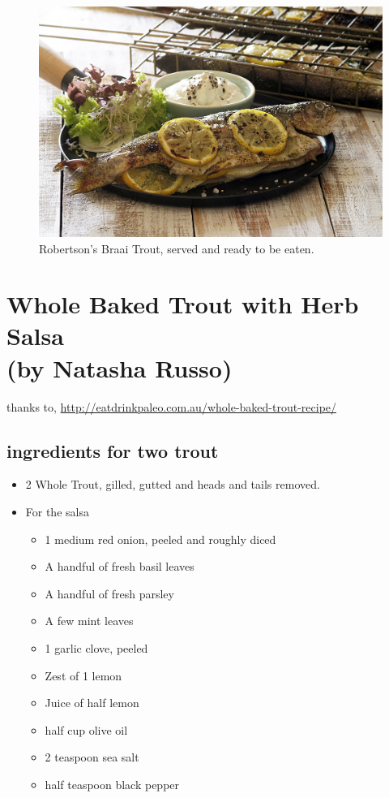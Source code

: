 \begin{figure}[H]
\centering
  \includegraphics[scale=0.2]{recipes/braaiTroutServed.jpg}
   \caption{Robertson's Braai Trout, served and ready to be eaten.}
  \label{fig:braaiTroutServed}
\end{figure}


\section{Whole Baked Trout with Herb Salsa \\ (by Natasha Russo)} 

thanks to,  \url{http://eatdrinkpaleo.com.au/whole-baked-trout-recipe/}

\subsection*{ingredients for two trout}

\begin{itemize}
\item 2 Whole Trout, gilled, gutted and heads and tails removed.
\item For the salsa
	\begin{itemize}
		\item 1 medium red onion, peeled and roughly diced
		\item A handful of fresh basil leaves
		\item A handful of fresh parsley
		\item A few mint leaves
		\item 1 garlic clove, peeled
		\item Zest of 1 lemon
		\item Juice of half lemon 
		\item half cup olive oil
		\item 2 teaspoon sea salt
		\item half teaspoon black pepper
	\end{itemize}
\end{itemize}

